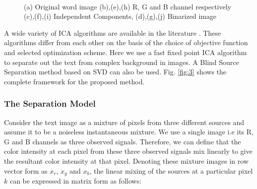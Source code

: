 \begin{figure}[t]
{}\\
\hspace*{1.5in}
\caption
{(a) Original word image (b),(e),(h) R, G and B channel respectively
(c),(f),(i) Independent Components, (d),(g),(j) Binarized image}
\label{fig:4}
\end{figure}

A wide variety of ICA algorithms are available in the literature \cite{A11,A12}. These algorithms differ from each other on the
basis of the choice of objective function and selected optimization scheme. Here we use a fast fixed point
ICA algorithm to separate out the text from complex background in images. A Blind Source 
Separation method based on SVD \cite{A10} can also be used. Fig. \ref{fig:3} 
shows the complete framework for the proposed method.

\subsubsection{The Separation Model}

Consider the text image as a mixture of pixels from three different sources
and assume it to be a noiseless instantaneous mixture.
We use a single image i.e its R, G and B channels as three observed signals.
Therefore, we can define that the color intensity at each pixel from these three observed signals
mix linearly to give the resultant color intensity at that pixel.
Denoting these mixture images in row vector form
as $x_r$, $x_g$ and $x_b$, the linear mixing of the sources at a particular pixel $k$ can be
expressed in matrix form as follows:

